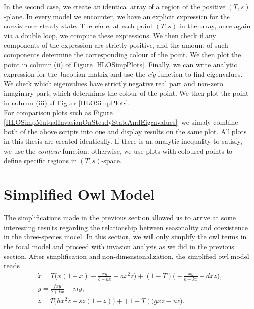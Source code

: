 \documentclass[12pt]{UOthesis}
\theoremstyle{remarkstyle}
\begin{document}
In the second case, we create an identical array of a region of the positive $(T,s)$-plane. In every model we encounter, we have an explicit expression for the coexistence steady state. Therefore, at each point $(T,s)$ in the array, once again via a double loop, we compute these expressions. We then check if any components of the expression are strictly positive, and the amount of such components determine the corresponding colour of the point. We then plot the point in column (ii) of Figure \ref{HLOSimpPlots}. Finally, we can write analytic expression for the Jacobian matrix and use the \textit{eig} function to find eigenvalues. We check which eigenvalues have strictly negative real part and non-zero imaginary part, which determines the colour of the point. We then plot the point in column (iii) of Figure \ref{HLOSimpPlots}.\\

For comparison plots such as Figure \ref{HLOSimpMutualInvasionOnSteadyStateAndEigenvalues}, we simply combine both of the above scripts into one and display results on the same plot. All plots in this thesis are created identically. If there is an analytic inequality to satisfy, we use the \textit{contour} function; otherwise, we use plots with coloured points to define specific regions in $(T,s)$-space.\\

\section{Simplified Owl Model}
\label{SectionSimpOwl}

The simplifications made in the previous section allowed us to arrive at some interesting results regarding the relationship between seasonality and coexistence in the three-species model. In this section, we will only simplify the owl terms in the focal model and proceed with invasion analysis as we did in the previous section. After simplification and non-dimensionalization, the simplified owl model reads
\begin{equation}
	\begin{split}
		&\dot{x}=T\Big(x(1-x)-\frac{xy}{b+kx}-a x^2z\Big)+(1-T)\Big(-\frac{xy}{b+kx}-d xz\Big),\\
		&\dot{y}=\frac{fxy}{b+kx}-my,\\
		&\dot{z}=T\Big(hx^2z+sz(1-z)\Big)+(1-T)\Big(gxz-uz\Big).
	\end{split}
	\label{HLOOwlSimp}
\end{equation}
\end{document}
